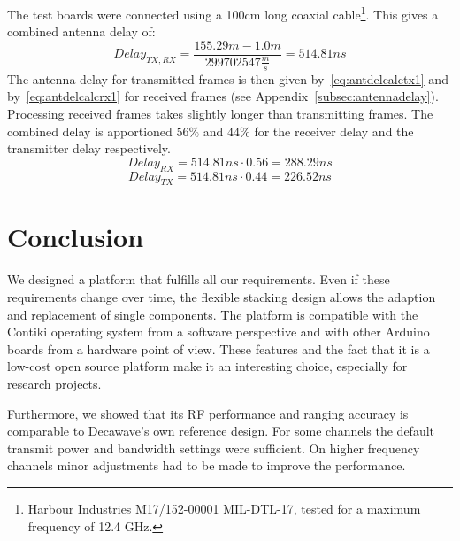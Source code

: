 \documentclass[journal,comsoc]{IEEEtran}
\begin{document}
The test boards were connected using a 100cm long coaxial cable\footnote{Harbour Industries M17/152-00001 MIL-DTL-17, tested for a maximum frequency of 12.4 GHz.}. 
This gives a combined antenna delay of:
\begin{equation}
\label{eq:antdelcalc}
Delay_{TX,RX} = \frac{155.29m - 1.0m}{299702547\frac{m}{s}} = 514.81ns
\end{equation}
The antenna delay for transmitted frames is then given by~\eqref{eq:antdelcalctx1} and by~\eqref{eq:antdelcalcrx1} for received frames (see Appendix~\ref{subsec:antennadelay}).
Processing received frames takes slightly longer than transmitting frames.
The combined delay is apportioned $56\%$ and $44\%$ for the receiver delay and the transmitter delay respectively. 
\begin{equation}
\label{eq:antdelcalctx1}
Delay_{RX} = 514.81ns \cdot 0.56 = 288.29ns
\end{equation}
\begin{equation}
\label{eq:antdelcalcrx1}
Delay_{TX} = 514.81ns \cdot 0.44 = 226.52ns
\end{equation}

\section{Conclusion}
\label{sec:conclusion}
We designed a platform that fulfills all our requirements.
Even if these requirements change over time, the flexible stacking design allows the adaption and replacement of single components.
The platform is compatible with the Contiki operating system from a software perspective and with other Arduino boards from a hardware point of view.
These features and the fact that it is a low-cost open source platform make it an interesting choice, especially for research projects.

Furthermore, we showed that its RF performance and ranging accuracy is comparable to Decawave's own reference design. 
For some channels the default transmit power and bandwidth settings were sufficient.
On higher frequency channels minor adjustments had to be made to improve the performance.


\end{document}
